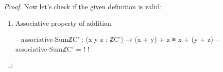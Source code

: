 \documentclass[a4paper]{report}
\theoremstyle{definition}
\begin{document}
\begin{proof}
  Now let's check if the given definition is valid:
  \begin{enumerate}
    \item Associative property of addition
      \begin{code}
-- associative-SumℤC' : (x y z : ℤC') → (x + y) + z ≡ x + (y + z)
-- associative-SumℤC' = {!   !}
      \end{code}
  \end{enumerate}
\end{proof}
\end{document}
